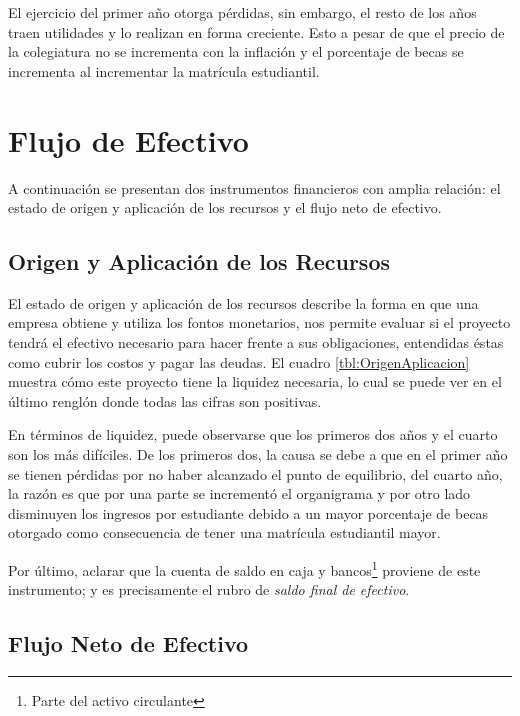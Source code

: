 El ejercicio del primer año otorga pérdidas, sin embargo, el resto de los años traen utilidades y lo realizan en forma creciente. Esto a pesar de que el precio de la colegiatura no se incrementa con la inflación y el porcentaje de becas se incrementa al incrementar la matrícula estudiantil.



\clearpage
\section{Flujo de Efectivo}

A continuación se presentan dos instrumentos financieros con amplia relación: el estado de origen y aplicación de los recursos y el flujo neto de efectivo.

\subsection{Origen y Aplicación de los Recursos}

El estado de origen y aplicación de los recursos describe la forma en que una empresa obtiene y utiliza los fontos monetarios, nos permite evaluar si el proyecto tendrá el efectivo necesario para hacer frente a sus obligaciones, entendidas éstas como cubrir los costos y pagar las deudas. El cuadro \ref{tbl:OrigenAplicacion} muestra cómo este proyecto tiene la liquidez necesaria, lo cual se puede ver en el último renglón donde todas las cifras son positivas.

En términos de liquidez, puede observarse que los primeros dos años y el cuarto son los más difíciles. De los primeros dos, la causa se debe a que en el primer año se tienen pérdidas por no haber alcanzado el punto de equilibrio, del cuarto año, la razón es que por una parte se incrementó el organigrama y por otro lado disminuyen los ingresos por estudiante debido a un mayor porcentaje de becas otorgado como consecuencia de tener una matrícula estudiantil mayor.

Por último, aclarar que la cuenta de saldo en caja y bancos\footnote{Parte del activo circulante} proviene de este instrumento; y es precisamente el rubro de \emph{saldo final de efectivo}.



\subsection{Flujo Neto de Efectivo}
\label{sub:FNE}

